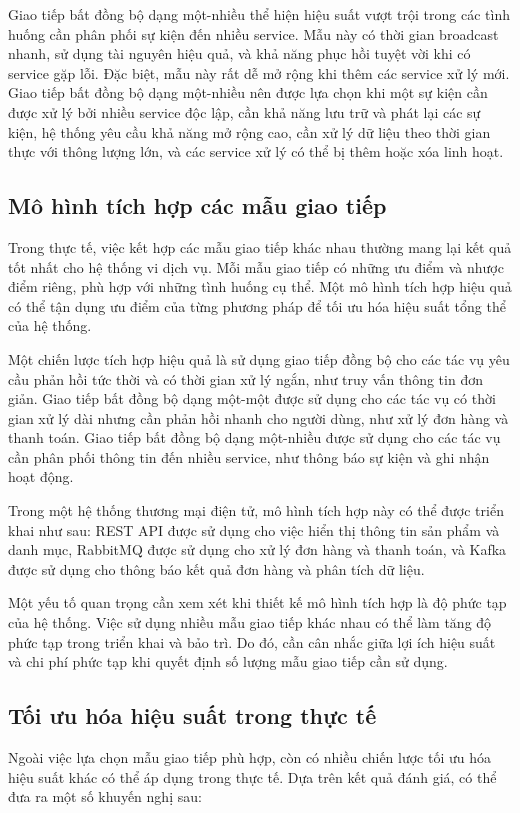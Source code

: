 Giao tiếp bất đồng bộ dạng một-nhiều thể hiện hiệu suất vượt trội trong các tình huống cần phân phối sự kiện đến nhiều service. Mẫu này có thời gian broadcast nhanh, sử dụng tài nguyên hiệu quả, và khả năng phục hồi tuyệt vời khi có service gặp lỗi. Đặc biệt, mẫu này rất dễ mở rộng khi thêm các service xử lý mới. Giao tiếp bất đồng bộ dạng một-nhiều nên được lựa chọn khi một sự kiện cần được xử lý bởi nhiều service độc lập, cần khả năng lưu trữ và phát lại các sự kiện, hệ thống yêu cầu khả năng mở rộng cao, cần xử lý dữ liệu theo thời gian thực với thông lượng lớn, và các service xử lý có thể bị thêm hoặc xóa linh hoạt.

\subsection{Mô hình tích hợp các mẫu giao tiếp}
Trong thực tế, việc kết hợp các mẫu giao tiếp khác nhau thường mang lại kết quả tốt nhất cho hệ thống vi dịch vụ. Mỗi mẫu giao tiếp có những ưu điểm và nhược điểm riêng, phù hợp với những tình huống cụ thể. Một mô hình tích hợp hiệu quả có thể tận dụng ưu điểm của từng phương pháp để tối ưu hóa hiệu suất tổng thể của hệ thống.

Một chiến lược tích hợp hiệu quả là sử dụng giao tiếp đồng bộ cho các tác vụ yêu cầu phản hồi tức thời và có thời gian xử lý ngắn, như truy vấn thông tin đơn giản. Giao tiếp bất đồng bộ dạng một-một được sử dụng cho các tác vụ có thời gian xử lý dài nhưng cần phản hồi nhanh cho người dùng, như xử lý đơn hàng và thanh toán. Giao tiếp bất đồng bộ dạng một-nhiều được sử dụng cho các tác vụ cần phân phối thông tin đến nhiều service, như thông báo sự kiện và ghi nhận hoạt động.

Trong một hệ thống thương mại điện tử, mô hình tích hợp này có thể được triển khai như sau: REST API được sử dụng cho việc hiển thị thông tin sản phẩm và danh mục, RabbitMQ được sử dụng cho xử lý đơn hàng và thanh toán, và Kafka được sử dụng cho thông báo kết quả đơn hàng và phân tích dữ liệu.

Một yếu tố quan trọng cần xem xét khi thiết kế mô hình tích hợp là độ phức tạp của hệ thống. Việc sử dụng nhiều mẫu giao tiếp khác nhau có thể làm tăng độ phức tạp trong triển khai và bảo trì. Do đó, cần cân nhắc giữa lợi ích hiệu suất và chi phí phức tạp khi quyết định số lượng mẫu giao tiếp cần sử dụng.

\subsection{Tối ưu hóa hiệu suất trong thực tế}
Ngoài việc lựa chọn mẫu giao tiếp phù hợp, còn có nhiều chiến lược tối ưu hóa hiệu suất khác có thể áp dụng trong thực tế. Dựa trên kết quả đánh giá, có thể đưa ra một số khuyến nghị sau:

